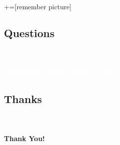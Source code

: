 \documentclass[12 pt]{beamer}
\begin{document}
+=[remember picture]







             
\subsection{Questions}

\begin{frame}[c]
\ \\ \ \\
\centering \Huge \textcolor{white}{\textbf{\forbold Questions? \newline Please make my day!}}

\end{frame}
\usebackgroundtemplate{}




\subsection{Thanks}


\begin{frame}[c]
\setsansfont{SoupLeaf}
\ \\ \ \\
\centering \Huge \textcolor{AwesomeYellow}{\textbf{\forbold Thank You!}}
\usebackgroundtemplate{}
\end{frame}
\end{document}
